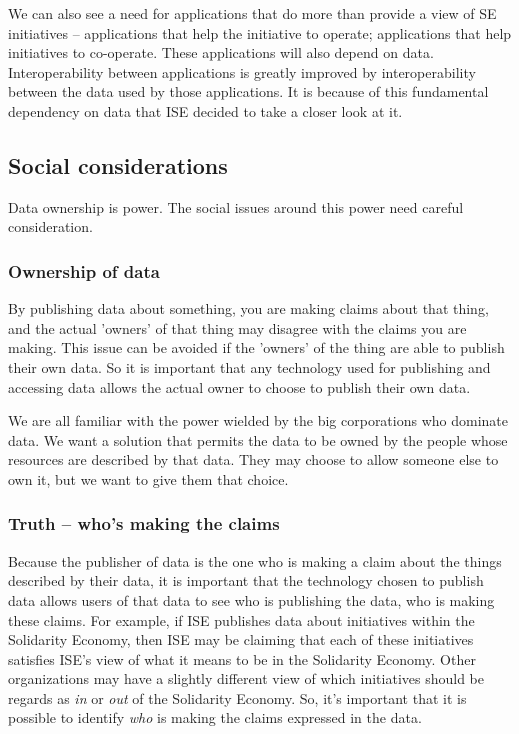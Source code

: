 \documentclass[11pt,twoside,a4paper]{article}
\begin{document}
We can also see a need for applications that do more than provide a view of SE initiatives -- 
applications that help the initiative to operate;
applications that help initiatives to co-operate.
These applications will also depend on data.
Interoperability between applications is greatly improved by interoperability between the data used by those applications.
It is because of this fundamental dependency on data that ISE decided to take a closer look at it.


\subsection{Social considerations}

Data ownership is power. The social issues around this power need careful consideration.

\subsubsection{Ownership of data}
By publishing data about something, you are making claims about that thing, and the actual 'owners' of that thing may disagree with the claims you are making.
This issue can be avoided if the 'owners' of the thing are able to publish their own data.
So it is important that any technology used for publishing and accessing data allows the actual owner to choose to publish their own data.

We are all familiar with the power wielded by the big corporations who dominate data.
We want a solution that permits the data to be owned by the people whose resources are described by that data.
They may choose to allow someone else to own it, but we want to give them that choice.

\subsubsection{Truth -- who's making the claims}
Because the publisher of data is the one who is making a claim about the things described by their data,
it is important that the technology chosen to publish data allows users of that data to see who is publishing the data, who is making these claims.
For example, if ISE publishes data about initiatives within the Solidarity Economy, 
then ISE may be claiming that each of these initiatives satisfies ISE's view of what it means to be in the Solidarity Economy.
Other organizations may have a slightly different view of which initiatives should be regards as \textit{in} or \textit{out} of the Solidarity Economy.
So, it's important that it is possible to identify \textit{who} is making the claims expressed in the data.
\end{document}
